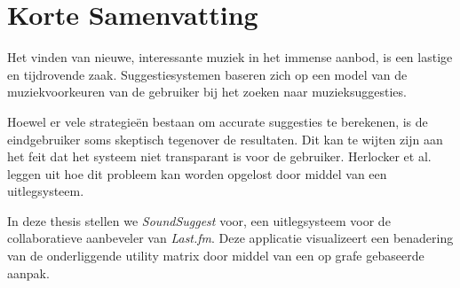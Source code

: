 \chapter*{Korte Samenvatting}\label{chapter:summary:dutch}


Het vinden van nieuwe, interessante muziek in het immense aanbod, is een lastige en tijdrovende zaak. Suggestiesystemen baseren zich op een model van de muziekvoorkeuren van de gebruiker bij het zoeken naar muzieksuggesties.



Hoewel er vele strategie\"en bestaan om accurate suggesties te berekenen, is de eindgebruiker soms skeptisch tegenover de resultaten. Dit kan te wijten zijn aan het feit dat het systeem niet transparant is voor de gebruiker. Herlocker et al. \cite{herlocker:2000} leggen uit hoe dit probleem kan worden opgelost door middel van een uitlegsysteem.



In deze thesis stellen we \emph{SoundSuggest} voor, een uitlegsysteem voor de collaboratieve aanbeveler van \emph{Last.fm}. Deze applicatie visualizeert een benadering van de onderliggende utility matrix door middel van een op grafe gebaseerde aanpak.

